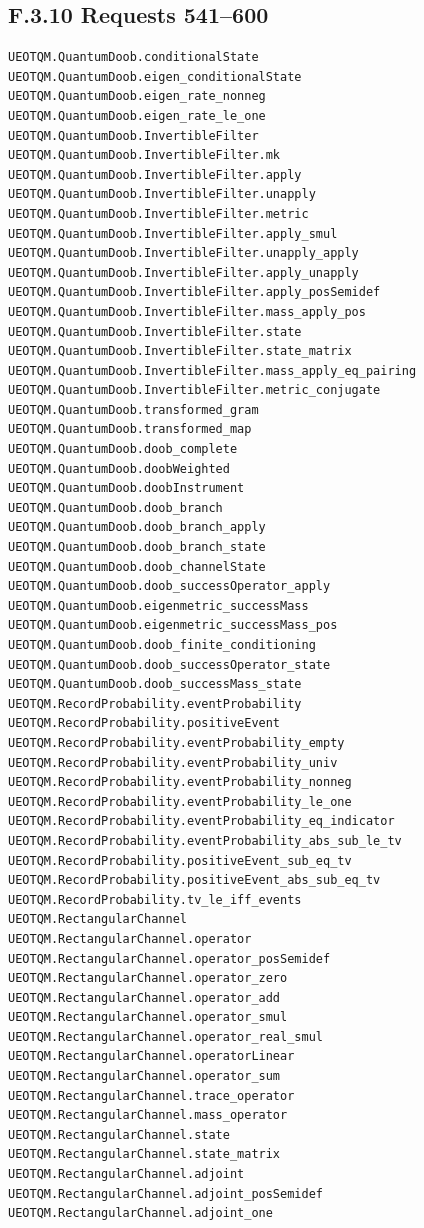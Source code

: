 \documentclass[
  11pt,
  oneside]{book}
\begin{document}
\subsection{F.3.10 Requests 541--600}

\begin{Verbatim}[breaklines,breakanywhere,fontsize=\scriptsize]
UEOTQM.QuantumDoob.conditionalState
UEOTQM.QuantumDoob.eigen_conditionalState
UEOTQM.QuantumDoob.eigen_rate_nonneg
UEOTQM.QuantumDoob.eigen_rate_le_one
UEOTQM.QuantumDoob.InvertibleFilter
UEOTQM.QuantumDoob.InvertibleFilter.mk
UEOTQM.QuantumDoob.InvertibleFilter.apply
UEOTQM.QuantumDoob.InvertibleFilter.unapply
UEOTQM.QuantumDoob.InvertibleFilter.metric
UEOTQM.QuantumDoob.InvertibleFilter.apply_smul
UEOTQM.QuantumDoob.InvertibleFilter.unapply_apply
UEOTQM.QuantumDoob.InvertibleFilter.apply_unapply
UEOTQM.QuantumDoob.InvertibleFilter.apply_posSemidef
UEOTQM.QuantumDoob.InvertibleFilter.mass_apply_pos
UEOTQM.QuantumDoob.InvertibleFilter.state
UEOTQM.QuantumDoob.InvertibleFilter.state_matrix
UEOTQM.QuantumDoob.InvertibleFilter.mass_apply_eq_pairing
UEOTQM.QuantumDoob.InvertibleFilter.metric_conjugate
UEOTQM.QuantumDoob.transformed_gram
UEOTQM.QuantumDoob.transformed_map
UEOTQM.QuantumDoob.doob_complete
UEOTQM.QuantumDoob.doobWeighted
UEOTQM.QuantumDoob.doobInstrument
UEOTQM.QuantumDoob.doob_branch
UEOTQM.QuantumDoob.doob_branch_apply
UEOTQM.QuantumDoob.doob_branch_state
UEOTQM.QuantumDoob.doob_channelState
UEOTQM.QuantumDoob.doob_successOperator_apply
UEOTQM.QuantumDoob.eigenmetric_successMass
UEOTQM.QuantumDoob.eigenmetric_successMass_pos
UEOTQM.QuantumDoob.doob_finite_conditioning
UEOTQM.QuantumDoob.doob_successOperator_state
UEOTQM.QuantumDoob.doob_successMass_state
UEOTQM.RecordProbability.eventProbability
UEOTQM.RecordProbability.positiveEvent
UEOTQM.RecordProbability.eventProbability_empty
UEOTQM.RecordProbability.eventProbability_univ
UEOTQM.RecordProbability.eventProbability_nonneg
UEOTQM.RecordProbability.eventProbability_le_one
UEOTQM.RecordProbability.eventProbability_eq_indicator
UEOTQM.RecordProbability.eventProbability_abs_sub_le_tv
UEOTQM.RecordProbability.positiveEvent_sub_eq_tv
UEOTQM.RecordProbability.positiveEvent_abs_sub_eq_tv
UEOTQM.RecordProbability.tv_le_iff_events
UEOTQM.RectangularChannel
UEOTQM.RectangularChannel.operator
UEOTQM.RectangularChannel.operator_posSemidef
UEOTQM.RectangularChannel.operator_zero
UEOTQM.RectangularChannel.operator_add
UEOTQM.RectangularChannel.operator_smul
UEOTQM.RectangularChannel.operator_real_smul
UEOTQM.RectangularChannel.operatorLinear
UEOTQM.RectangularChannel.operator_sum
UEOTQM.RectangularChannel.trace_operator
UEOTQM.RectangularChannel.mass_operator
UEOTQM.RectangularChannel.state
UEOTQM.RectangularChannel.state_matrix
UEOTQM.RectangularChannel.adjoint
UEOTQM.RectangularChannel.adjoint_posSemidef
UEOTQM.RectangularChannel.adjoint_one
\end{Verbatim}
\end{document}
